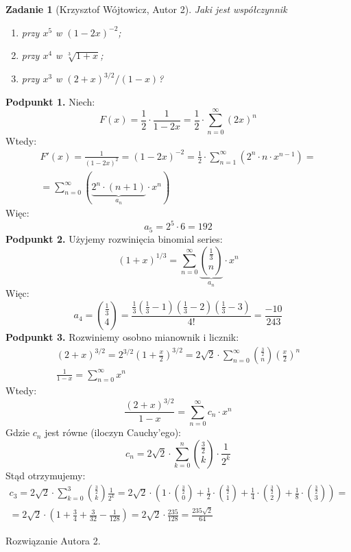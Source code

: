 \documentclass{mwart}
\newtheorem{zad}{Zadanie}[section]
\begin{document}
\begin{zad}[Krzysztof Wójtowicz, Autor 2]
    Jaki jest współczynnik
    \begin{enumerate}
        \item przy $x^5$ w $(1-2x)^{-2}$;
        \item przy $x^4$ w $\sqrt[3]{1+x}$;
        \item przy $x^3$ w $(2+x)^{3/2}/(1-x)$?
    \end{enumerate}
\end{zad}
\begin{mdframed}
    \textbf{Podpunkt 1.} \newline
    Niech:
    \[ F(x) = \frac{1}{2} \cdot \frac{1}{1-2x} = \frac{1}{2} \cdot \sum_{n=0}^{\infty} (2x)^n \]
    Wtedy:
    \begin{gather*}
        F'(x) = \frac{1}{(1-2x)^2} = (1-2x)^{-2} = \frac{1}{2} \cdot \sum_{n=1}^{\infty} (2^n \cdot n \cdot x^{n-1}) = \\ = \sum_{n=0}^{\infty} (\underbrace{2^n \cdot (n+1)}_{a_n} \cdot x^n)
    \end{gather*}
    Więc:
    \[ a_5 = 2^5 \cdot 6 = 192 \]
    \textbf{Podpunkt 2.} \newline
    Użyjemy rozwinięcia binomial series:
    \[ (1+x)^{1/3} = \sum_{n=0}^{\infty} \underbrace{\binom{\frac{1}{3}}{n}}_{a_n} \cdot x^n \]
    Więc:
    \[ a_4 = \binom{\frac{1}{3}}{4} = \frac{\frac{1}{3}(\frac{1}{3} - 1)(\frac{1}{3} - 2)(\frac{1}{3} - 3)}{4!} = \frac{-10}{243} \]
    \textbf{Podpunkt 3.} \newline
    Rozwiniemy osobno mianownik i licznik:
    \begin{gather*}
        (2+x)^{3/2} = 2^{3/2}(1+\frac{x}{2})^{3/2} = 2\sqrt{2} \cdot \sum_{n=0}^{\infty} \binom{\frac{3}{2}}{n}(\frac{x}{2})^n \\
        \frac{1}{1-x} = \sum_{n=0}^{\infty} x^n
    \end{gather*}
    Wtedy:
    \[ \frac{(2+x)^{3/2}}{1-x} = \sum_{n=0}^{\infty} c_n \cdot x^n \]
    Gdzie $c_n$ jest równe (iloczyn Cauchy'ego):
    \[ c_n = 2\sqrt{2} \cdot \sum_{k=0}^{n} \binom{\frac{3}{2}}{k} \cdot \frac{1}{2^k} \]
    Stąd otrzymujemy:
    \begin{gather*}
        c_3 = 2\sqrt{2} \cdot \sum_{k=0}^{3} \binom{\frac{3}{2}}{k} \frac{1}{2^k} = 2\sqrt{2}\cdot(1\cdot\binom{\frac{3}{2}}{0} + \frac{1}{2}\cdot\binom{\frac{3}{2}}{1} + \frac{1}{4}\cdot\binom{\frac{3}{2}}{2} + \frac{1}{8}\cdot\binom{\frac{3}{2}}{3}) = \\ = 2\sqrt{2} \cdot (1 + \frac{3}{4} + \frac{3}{32} - \frac{1}{128}) = 2\sqrt{2}\cdot\frac{235}{128} = \frac{235\sqrt{2}}{64}
    \end{gather*}
\end{mdframed}
\begin{mdframed}
    Rozwiązanie Autora 2.
\end{mdframed}
\end{document}
